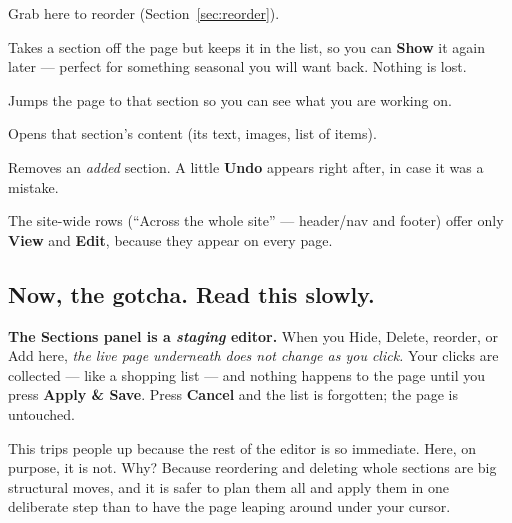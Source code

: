 \documentclass[11pt]{article}
\begin{document}
\begin{description}[style=nextline,leftmargin=1.4em]
  \item[drag] Grab here to reorder (Section~\ref{sec:reorder}).
  \item[Hide] Takes a section off the page but keeps it in the list, so you can
    \textbf{Show} it again later --- perfect for something seasonal you will want back.
    Nothing is lost.
  \item[View] Jumps the page to that section so you can see what you are working on.
  \item[Edit] Opens that section's content (its text, images, list of items).
  \item[Delete] Removes an \emph{added} section. A little \textbf{Undo} appears right
    after, in case it was a mistake.
\end{description}

\noindent The site-wide rows (``Across the whole site'' --- header/nav and footer)
offer only \textbf{View} and \textbf{Edit}, because they appear on every page.

\subsection{Now, the gotcha. Read this slowly.}

\textbf{The Sections panel is a \emph{staging} editor.} When you Hide, Delete,
reorder, or Add here, \emph{the live page underneath does not change as you click.}
Your clicks are collected --- like a shopping list --- and nothing happens to the
page until you press \textbf{Apply \& Save}. Press \textbf{Cancel} and the list is
forgotten; the page is untouched.

This trips people up because the rest of the editor is so immediate. Here, on purpose,
it is not. Why? Because reordering and deleting whole sections are big structural
moves, and it is safer to plan them all and apply them in one deliberate step than to
have the page leaping around under your cursor.

\begin{center}
\end{center}
\end{document}
